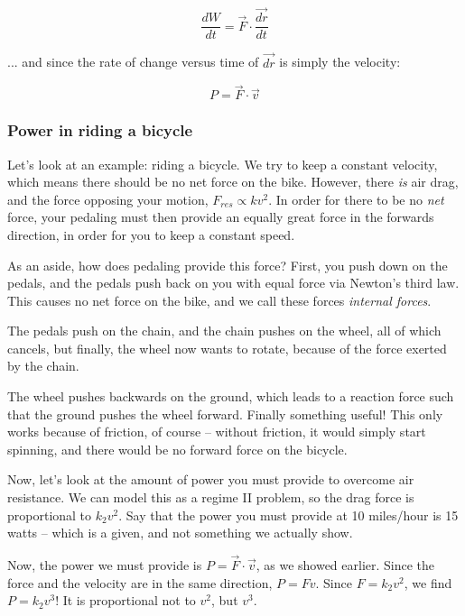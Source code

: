 \begin{equation}
\frac{dW}{dt} = \vec{F} \cdot \frac{\vec{dr}}{dt}
\end{equation}

... and since the rate of change versus time of $\vec{dr}$ is simply the velocity:

\begin{equation}
P = \vec{F} \cdot \vec{v}
\end{equation}

\subsubsection{Power in riding a bicycle}

Let's look at an example: riding a bicycle. We try to keep a constant velocity, which means there should be no net force on the bike. However, there \emph{is} air drag, and the force opposing your motion, $F_{res} \propto k v^2$. In order for there to be no \emph{net} force, your pedaling must then provide an equally great force in the forwards direction, in order for you to keep a constant speed.

As an aside, how does pedaling provide this force? First, you push down on the pedals, and the pedals push back on you with equal force via Newton's third law. This causes no net force on the bike, and we call these forces \emph{internal forces}.

The pedals push on the chain, and the chain pushes on the wheel, all of which cancels, but finally, the wheel now wants to rotate, because of the force exerted by the chain.

The wheel pushes backwards on the ground, which leads to a reaction force such that the ground pushes the wheel forward. Finally something useful! This only works because of friction, of course -- without friction, it would simply start spinning, and there would be no forward force on the bicycle.

Now, let's look at the amount of power you must provide to overcome air resistance. We can model this as a regime II problem, so the drag force is proportional to $k_2 v^2$. Say that the power you must provide at 10 miles/hour is 15 watts -- which is a given, and not something we actually show.

Now, the power we must provide is $P = \vec{F} \cdot \vec{v}$, as we showed earlier. Since the force and the velocity are in the same direction, $P = F v$. Since $F = k_2 v^2$, we find $P = k_2 v^3$! It is proportional not to $v^2$, but $v^3$.

